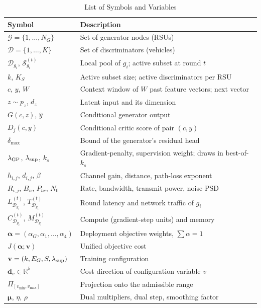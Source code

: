 \documentclass[journal]{IEEEtran}
\newcommand{\valpha}{\boldsymbol{\alpha}}
\newcommand{\vd}{\mathbf{d}}
\newcommand{\J}{J}
\begin{document}
\begin{table}[!t]
\centering
\caption{List of Symbols and Variables}
\label{tab:symbols}
\footnotesize
\begin{tabular}{ll}
\toprule
Symbol & Description \\
\midrule
$\mathcal{G}=\{1,\ldots,N_G\}$ & Set of generator nodes (RSUs) \\
$\mathcal{D}=\{1,\ldots,K\}$ & Set of discriminators (vehicles) \\
$\mathcal{D}_{g_i}$, $\mathcal{S}^{(t)}_{g_i}$ & Local pool of $g_i$; active subset at round $t$ \\
$k$, $K_S$ & Active subset size; active discriminators per RSU \\
$c$, $y$, $W$ & Context window of $W$ past feature vectors; next vector \\
$z\sim p_z$, $d_z$ & Latent input and its dimension \\
$G(c,z)$, $\hat{y}$ & Conditional generator output \\
$D_j(c,y)$ & Conditional critic score of pair $(c,y)$ \\
$\delta_{\max}$ & Bound of the generator's residual head \\
$\lambda_{\rm GP}$, $\lambda_{\rm sup}$, $k_s$ & Gradient-penalty, supervision weight; draws in best-of-$k_s$ \\
$h_{i,j}$, $d_{i,j}$, $\beta$ & Channel gain, distance, path-loss exponent \\
$R_{i,j}$, $B_n$, $P_{tx}$, $N_0$ & Rate, bandwidth, transmit power, noise PSD \\
$L^{(t)}_{\mathcal{D}_{g_i}}$, $T^{(t)}_{\mathcal{D}_{g_i}}$ & Round latency and network traffic of $g_i$ \\
$C^{(t)}_{\mathcal{D}_{g_i}}$, $M^{(t)}_{\mathcal{D}_{g_i}}$ & Compute (gradient-step units) and memory \\
$\valpha=(\alpha_G,\alpha_1,\ldots,\alpha_4)$ & Deployment objective weights, $\sum\alpha=1$ \\
$\J(\valpha;\mathbf{v})$ & Unified objective cost \\
$\mathbf{v}=(k,E_G,S,\lambda_{\rm sup})$ & Training configuration \\
$\vd_v\in\mathbb{R}^5$ & Cost direction of configuration variable $v$ \\
$\Pi_{[v_{\min},v_{\max}]}$ & Projection onto the admissible range \\
$\boldsymbol{\mu}$, $\eta$, $\rho$ & Dual multipliers, dual step, smoothing factor \\

\end{tabular}
\end{table}
\end{document}
